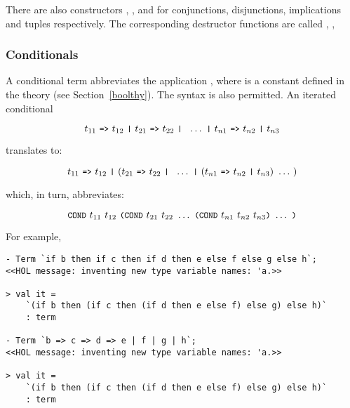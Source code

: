 \noindent There are also constructors
,
,
 and
for conjunctions, disjunctions, implications and tuples respectively.
The corresponding destructor functions are called , \etc,


\subsubsection{Conditionals}\label{conditionals}

A conditional
 term  abbreviates the application
, where 
is a constant defined in the theory  (see Section~\ref{boolthy}).
The syntax  is also permitted. An
iterated conditional 

\[
t_{11}\ \ml{=>}\ t_{12}\ \ml{|}\
t_{21}\ \ml{=>}\ t_{22}\ \ml{|}\
\ \ldots\ \ml{|}\
t_{n1}\ \ml{=>}\ t_{n2}\ \ml{|}\ t_{n3}
\]

\noindent translates to:

\[
t_{11}\ \ml{=>}\ t_{12}\ \ml{|}\
(t_{21}\ \ml{=>}\ t_{22}\ \ml{|}\
\ \ldots\ \ml{|}\
(t_{n1}\ \ml{=>}\ t_{n2}\ \ml{|}\ t_{n3})\ \ldots\ )
\]

\noindent which, in turn, abbreviates:

\[\ml{COND}\ t_{11}\ t_{12}\ \ml{(COND}\ t_{21}\ t_{22}\ \ldots\
\ml{(COND}\ t_{n1}\ t_{n2}\ t_{n3}\ml{)}\ \ldots\ \ml{)}\]

\noindent For example, 

\begin{session}\begin{verbatim}
- Term `if b then if c then if d then e else f else g else h`;
<<HOL message: inventing new type variable names: 'a.>>

> val it =
    `(if b then (if c then (if d then e else f) else g) else h)`
    : term

- Term `b => c => d => e | f | g | h`;
<<HOL message: inventing new type variable names: 'a.>>

> val it =
    `(if b then (if c then (if d then e else f) else g) else h)`
    : term

\end{verbatim}\end{session}

